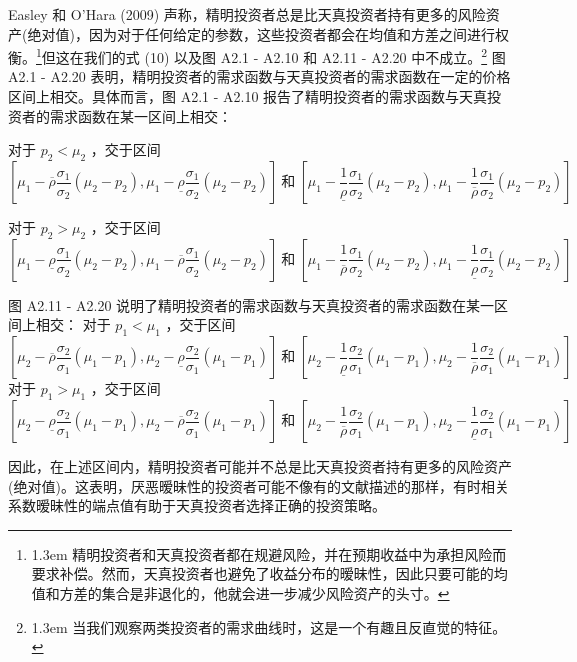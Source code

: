\documentclass[10.0pt]{article}
\begin{document}
Easley 和 O'Hara (2009) 声称，精明投资者总是比天真投资者持有更多的风险资产(绝对值)，因为对于任何给定的参数，这些投资者都会在均值和方差之间进行权衡。\footnote{\baselineskip1.3em 精明投资者和天真投资者都在规避风险，并在预期收益中为承担风险而要求补偿。然而，天真投资者也避免了收益分布的暧昧性，因此只要可能的均值和方差的集合是非退化的，他就会进一步减少风险资产的头寸。}但这在我们的式 (10) 以及图 A2.1 - A2.10 和 A2.11 - A2.20 中不成立。\footnote{\baselineskip1.3em 当我们观察两类投资者的需求曲线时，这是一个有趣且反直觉的特征。} 图 A2.1 - A2.20 表明，精明投资者的需求函数与天真投资者的需求函数在一定的价格区间上相交。具体而言，图 A2.1 - A2.10 报告了精明投资者的需求函数与天真投资者的需求函数在某一区间上相交：

对于 $ p_2 < \mu_2 $ ，交于区间
$$ \left[ \mu_1 - \overline{\rho} \dfrac{\sigma_1}{\sigma_2} (\mu_2 - p_2), \mu_1 - \underline{\rho} \dfrac{\sigma_1}{\sigma_2} (\mu_2 - p_2) \right] \ \text{和} \ \left[ \mu_1 - \dfrac1{\underline{\rho}} \dfrac{\sigma_1}{\sigma_2} (\mu_2 - p_2), \mu_1 - \dfrac1{\overline{\rho}} \dfrac{\sigma_1}{\sigma_2} (\mu_2 - p_2) \right] $$


对于 $ p_2 > \mu_2 $ ，交于区间
$$ \left[ \mu_1 - \underline{\rho} \dfrac{\sigma_1}{\sigma_2} (\mu_2 - p_2), \mu_1 - \overline{\rho} \dfrac{\sigma_1}{\sigma_2} (\mu_2 - p_2) \right] \ \text{和} \ \left[ \mu_1 - \dfrac1{\overline{\rho}} \dfrac{\sigma_1}{\sigma_2} (\mu_2 - p_2), \mu_1 - \dfrac1{\underline{\rho}} \dfrac{\sigma_1}{\sigma_2} (\mu_2 - p_2) \right] $$

图 A2.11 - A2.20 说明了精明投资者的需求函数与天真投资者的需求函数在某一区间上相交：
对于 $ p_1 < \mu_1 $ ，交于区间
$$ \left[ \mu_2 - \overline{\rho} \dfrac{\sigma_2}{\sigma_1} (\mu_1 - p_1), \mu_2 - \underline{\rho} \dfrac{\sigma_2}{\sigma_1} (\mu_1 - p_1) \right] \ \text{和} \ \left[ \mu_2 - \dfrac1{\underline{\rho}} \dfrac{\sigma_2}{\sigma_1} (\mu_1 - p_1), \mu_2 - \dfrac1{\overline{\rho}} \dfrac{\sigma_2}{\sigma_1} (\mu_1 - p_1) \right] $$
对于 $ p_1 > \mu_1 $ ，交于区间
$$ \left[ \mu_2 - \underline{\rho} \dfrac{\sigma_2}{\sigma_1} (\mu_1 - p_1), \mu_2 - \overline{\rho} \dfrac{\sigma_2}{\sigma_1} (\mu_1 - p_1) \right] \ \text{和} \ \left[ \mu_2 - \dfrac1{\overline{\rho}} \dfrac{\sigma_2}{\sigma_1} (\mu_1 - p_1), \mu_2 - \dfrac1{\underline{\rho}} \dfrac{\sigma_2}{\sigma_1} (\mu_1 - p_1) \right] $$


因此，在上述区间内，精明投资者可能并不总是比天真投资者持有更多的风险资产(绝对值)。这表明，厌恶暧昧性的投资者可能不像有的文献描述的那样，有时相关系数暧昧性的端点值有助于天真投资者选择正确的投资策略。
\end{document}
